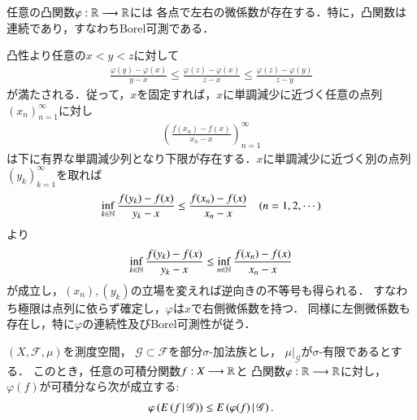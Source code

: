 	\begin{screen}
		\begin{lem}[凸関数の片側微係数の存在]
			任意の凸関数$\varphi:\mathbb{R} \longrightarrow \mathbb{R}$には
			各点で左右の微係数が存在する．特に，凸関数は連続であり，すなわちBorel可測である．
		\end{lem}
	\end{screen}
	
	\begin{prf}
		凸性より任意の$x < y < z$に対して
		\begin{align}
			\frac{\varphi(y) - \varphi(x)}{y - x} 
			\leq \frac{\varphi(z) - \varphi(x)}{z - x}
			\leq \frac{\varphi(z) - \varphi(y)}{z - y}
			\label{ineq:lem:convex_function_measurability_1}
		\end{align}
		が満たされる．従って，$x$を固定すれば，$x$に単調減少に近づく任意の点列$(x_n)_{n=1}^{\infty}$に対し
		 \begin{align}
		 	\left(\frac{f(x_n)-f(x)}{x_n-x}\right)_{n=1}^{\infty} 
		 	\label{seq:lem:convex_function_measurability_2}
		 \end{align}
		 は下に有界な単調減少列となり下限が存在する．$x$に単調減少に近づく別の点列$(y_k)_{k=1}^{\infty}$を取れば
		 \begin{align}
		 	\operatorname*{inf}_{k \in \mathbb{N}} \frac{f(y_k)-f(x)}{y_k-x} \leq \frac{f(x_n)-f(x)}{x_n-x} \quad (n=1,2,\cdots)
		 \end{align}
		 より
		 \begin{align}
		 	\operatorname*{inf}_{k \in \mathbb{N}} \frac{f(y_k)-f(x)}{y_k-x} \leq \operatorname*{inf}_{n \in \mathbb{N}} \frac{f(x_n)-f(x)}{x_n-x}
		 \end{align}
		 が成立し，$(x_n),(y_k)$の立場を変えれば逆向きの不等号も得られる．
		 すなわち極限は点列に依らず確定し，$\varphi$は$x$で右側微係数を持つ．
		 同様に左側微係数も存在し，特に$\varphi$の連続性及びBorel可測性が従う．
		 \QED
	\end{prf}
	
	\begin{screen}
		\begin{thm}[Jensenの不等式]
			$(X,\mathscr{F},\mu)$を測度空間，
			$\mathscr{G} \subset \mathscr{F}$を部分$\sigma$-加法族とし，
			$\left. \mu \right|_{\mathscr{G}}$が$\sigma$-有限であるとする．
			このとき，任意の可積分関数$f:X \longrightarrow \mathbb{R}$と
			凸関数$\varphi:\mathbb{R} \longrightarrow \mathbb{R}$に対し，
			$\varphi(f)$が可積分なら次が成立する:
			\begin{align}
				\varphi\left(E\left( f \, \middle|\, \mathscr{G} \right) \right)
				\leq E\left( \varphi(f) \, \middle|\, \mathscr{G} \right).
			\end{align}
		\end{thm}
	\end{screen}
	
